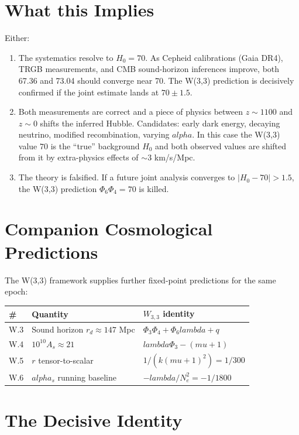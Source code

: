 \documentclass[12pt,a4paper]{article}
\def\textbf#1{#1}%
\def\alpha{alpha}%
\def\lambda{lambda}%
\def\mu{mu}%
\def\Phi#1{Phi#1}%
\theoremstyle{definition}
\begin{document}
\section*{What this Implies}

Either:
\begin{enumerate}[leftmargin=2em]
\item \textbf{The systematics resolve to $H_0 = 70$.} As Cepheid
calibrations (Gaia DR4), TRGB measurements, and CMB sound-horizon
inferences improve, both 67.36 and 73.04 should converge near 70.
The W(3,3) prediction is decisively confirmed if the joint estimate
lands at $70 \pm 1.5$.
\item \textbf{Both measurements are correct} and a piece of physics
between $z\sim 1100$ and $z\sim 0$ shifts the inferred Hubble.
Candidates: early dark energy, decaying neutrino, modified
recombination, varying $\alpha$. In this case the W(3,3) value $70$
is the ``true'' background $H_0$ and both observed values are
shifted from it by extra-physics effects of $\sim 3$ km/s/Mpc.
\item \textbf{The theory is falsified.} If a future joint analysis
converges to $|H_0 - 70| > 1.5$, the W(3,3) prediction
$\Phi_6\Phi_4 = 70$ is killed.
\end{enumerate}

\section*{Companion Cosmological Predictions}

The W(3,3) framework supplies further fixed-point predictions for
the same epoch:

\begin{center}
\begin{tabular}{lll}
\toprule
\# & Quantity & $W_{3,3}$ identity \\
\midrule
W.3 & Sound horizon $r_d \approx 147$ Mpc & $\Phi_3\Phi_4 + \Phi_6\lambda + q$ \\
W.4 & $10^{10}A_s \approx 21$ & $\lambda\Phi_3-(\mu+1)$ \\
W.5 & $r$ tensor-to-scalar & $1/(k(\mu+1)^2) = 1/300$ \\
W.6 & $\alpha_s$ running baseline & $-\lambda/N_e^{2} = -1/1800$ \\
\bottomrule
\end{tabular}
\end{center}

\section*{The Decisive Identity}
\end{document}

